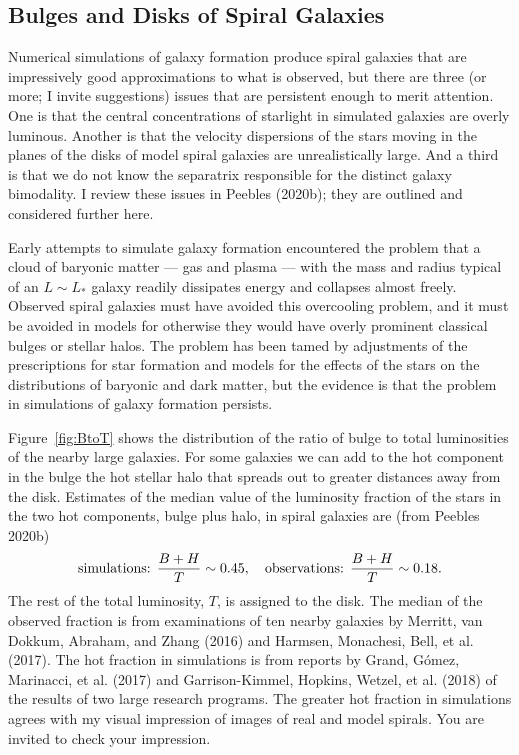 \documentclass[fleqn,usenatbib]{mnras}
\newcommand{\beq}{\begin{equation}}
\newcommand{\eeq}{\end{equation}}
\begin{document}
\subsection{Bulges and Disks of Spiral Galaxies}\label{sec:spirals}

 Numerical simulations of galaxy formation produce spiral galaxies that are impressively good approximations to what is observed, but there are three (or more; I invite suggestions) issues that are persistent enough to merit attention. One is that the central concentrations of starlight in simulated galaxies are overly luminous. Another is that the velocity dispersions of the stars moving in the planes of the disks of model spiral galaxies are unrealistically large. And a third is that we do not know the separatrix responsible for the distinct galaxy bimodality. I review these issues in Peebles (2020b); they are outlined and considered further here. 

Early attempts to simulate galaxy formation encountered the problem that a cloud of baryonic matter --- gas and plasma --- with the mass and radius typical of an $L\sim L_\ast$ galaxy readily dissipates energy and collapses almost freely. Observed spiral galaxies must have avoided this overcooling problem, and it must be avoided in models for otherwise they would have overly prominent classical bulges or stellar halos. The problem has been tamed by adjustments of the prescriptions for star formation and models for the effects of the stars on the distributions of baryonic and dark matter, but the evidence is that the problem in simulations of galaxy formation persists.

Figure~\ref{fig:BtoT} shows the distribution of the ratio of bulge to total luminosities of the nearby large galaxies. For some galaxies we can add to the hot component in the bulge the hot stellar halo that spreads out to greater distances away from the disk. Estimates of the median value of the luminosity fraction of the stars in the two hot components, bulge plus halo, in spiral galaxies are (from Peebles 2020b)
\beq
\hbox{simulations: }{B+H\over T}\sim 0.45,\quad \hbox{observations: }{B+H\over T}\sim 0.18. \label{eq:BHoverT}
\eeq
The rest of the total luminosity, $T$, is assigned to the disk. The median of the  observed fraction is from examinations of ten nearby galaxies by Merritt, van Dokkum, Abraham, and Zhang (2016) and Harmsen, Monachesi, Bell, et al. (2017). The hot  fraction in simulations is from reports by Grand, G{\'o}mez, Marinacci, et al. (2017) and Garrison-Kimmel, Hopkins, Wetzel, et al. (2018) of the results of two large research programs. The greater hot fraction in simulations agrees with my visual impression of images of real and model spirals. You are invited to check your impression. 
\end{document}
